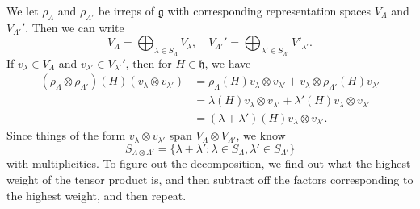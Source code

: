 \documentclass[a4paper]{article}
\begin{document}
We let $\rho_\Lambda$ and $\rho_{\Lambda'}$ be irreps of $\mathfrak{g}$ with corresponding representation spaces $V_\Lambda$ and $V_{\Lambda'}'$. Then we can write
\[
  V_\Lambda = \bigoplus_{\lambda \in S_\Lambda} V_\lambda,\quad V_{\Lambda'}' = \bigoplus_{\lambda' \in S_{\Lambda'}} V'_{\lambda'}.
\]
If $v_\lambda \in V_\Lambda$ and $v_{\lambda'} \in V_{\lambda'}'$, then for $H \in \mathfrak{h}$, we have
\begin{align*}
  (\rho_\Lambda \otimes \rho_{\Lambda'})(H)(v_\lambda \otimes v_{\lambda'}) &= \rho_\Lambda(H)v_\lambda \otimes v_{\lambda'} + v_\lambda \otimes \rho_{\Lambda'}(H) v_{\lambda'}\\
  &= \lambda(H) v_\lambda \otimes v_{\lambda'} + \lambda'(H) v_\lambda \otimes v_{\lambda'}\\
  &= (\lambda + \lambda')(H) v_\lambda \otimes v_{\lambda'}.
\end{align*}
Since things of the form $v_\lambda \otimes v_{\lambda'}$ span $V_\Lambda \otimes V_{\Lambda'}$, we know
\[
  S_{\Lambda \otimes \Lambda'} = \{\lambda + \lambda': \lambda \in S_\Lambda, \lambda' \in S_{\Lambda'}\}
\]
with multiplicities. To figure out the decomposition, we find out what the highest weight of the tensor product is, and then subtract off the factors corresponding to the highest weight, and then repeat.
\end{document}
